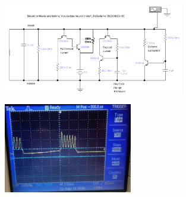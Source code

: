 \documentclass[12]{amsbook}
\newcommand\0{\mathbf{0}}
\newcommand\<{\langle}
\renewcommand\>{\rangle}
\begin{document}
\begin{figure}[H]
\includegraphics[width=0.7\textwidth]{burster_heart_cell}	
\end{figure}

\begin{figure}[H]
\includegraphics[width=0.5\textwidth]{burster_osc}	
\end{figure}




\nocite{*}
\end{document}
